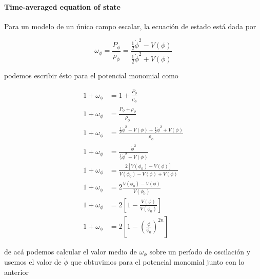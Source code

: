 \paragraph{Time-averaged equation of state}

Para un modelo de un único campo escalar, la ecuación de estado está dada por

\begin{equation}
    \omega_\phi = \frac{P_\phi}{\rho_\phi} = \frac{\displaystyle \frac{1}{2} \dot{\phi}^2 - V(\phi)}{\displaystyle \frac{1}{2} \dot{\phi}^2 + V(\phi)}
\end{equation}

\noindent
podemos escribir ésto para el potencial monomial como

\begin{equation*}
    \begin{split}
        1 + \omega_\phi &= 1 + \frac{P_\phi}{\rho_\phi}\\
        1 + \omega_\phi &= \frac{P_\phi + \rho_\phi}{\rho_\phi}\\
        1 + \omega_\phi &= \frac{\displaystyle \frac{1}{2} \dot{\phi}^2 - V(\phi) + \frac{1}{2} \dot{\phi}^2 + V(\phi)}{\rho_\phi}\\
        1 + \omega_\phi &= \frac{\dot{\phi}^2}{\displaystyle \frac{1}{2} \dot{\phi}^2 + V(\phi)}\\
        1 + \omega_\phi &= \frac{2 \left[ V(\phi_0) - V(\phi) \right]}{V(\phi_0) - V(\phi) + V(\phi)}\\
        1 + \omega_\phi &= 2 \frac{V (\phi_0) - V(\phi)}{V(\phi_0)}\\
        1 + \omega_\phi &= 2 \left[ 1 - \frac{V(\phi)}{V(\phi_0)} \right]\\
        1 + \omega_\phi &= 2 \left[ 1 - \left( \frac{\phi}{\phi_0} \right)^{2n} \right] 
    \end{split}
\end{equation*}

\noindent
de acá podemos calcular el valor medio de $\omega_\phi$ sobre un período de oscilación y usemos el valor de $\dot{\phi}$ que obtuvimos para el potencial monomial junto con lo anterior

